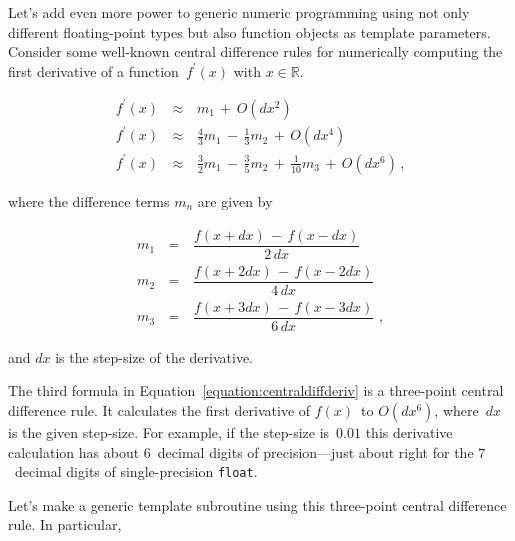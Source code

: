 \documentclass{article}[11pt,draft]
\begin{document}
Let's add even more power to generic numeric programming
using not only different floating-point types
but also function objects as template parameters.
Consider some well-known central difference rules for
numerically computing the first derivative of a
function~$f^{\prime}(x)$ with $x\in\mathbb{R}$.

\begin{eqnarray}
f^{\prime}\left(x\right) &\,\approx\,&       m_{1}
                                       \,+\, O(dx^{2}) \nonumber \\[3pt]
f^{\prime}\left(x\right) &\,\approx\,&       \frac{4}{3}m_{1}
                                       \,-\, \frac{1}{3}m_{2}
                                 \,+\, O(dx^{4}) \nonumber \\[3pt]
f^{\prime}\left(x\right) &\,\approx\,&       \frac{3}{2}m_{1}
                                       \,-\, \frac{3}{5}m_{2}
                                       \,+\, \frac{1}{10}m_{3}
                                       \,+\, O(dx^{6})\,{\text{,}}
\label{equation:centraldiffderiv}
\end{eqnarray}

\noindent where the difference terms $m_{n}$ are given by

\begin{eqnarray}
m_{1} &\,=\,& \dfrac{f\left(x+ dx\right)
              \,-\,  f\left(x- dx\right)}{2\,dx} \nonumber \\[3pt]
m_{2} &\,=\,& \dfrac{f\left(x+2dx\right)
              \,-\,  f\left(x-2dx\right)}{4\,dx} \nonumber \\[3pt]
m_{3} &\,=\,& \dfrac{f\left(x+3dx\right)   
              \,-\,  f\left(x-3dx\right)}{6\,dx}\,\,{\text{,}}
\end{eqnarray}

\noindent and $dx$ is the step-size of the derivative.

The third formula in Equation~\ref{equation:centraldiffderiv}
is a three-point central difference rule. It calculates
the first derivative of $f(x)$~to $O(dx^{6})$, where~$dx$
is the given step-size. For example, if the step-size is~$0.01$
this derivative calculation has about $6$~decimal digits
of precision---just about right for the $7$~decimal digits
of single-precision {\lstinline|float|}.

Let's make a generic template subroutine using this
three-point central difference rule. In particular, 
\end{document}
